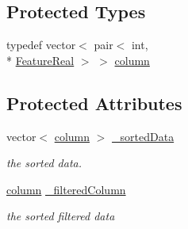 \subsection*{Protected Types}
\begin{DoxyCompactItemize}
\item 
typedef vector$<$ pair$<$ int, \\*
\hyperlink{Defaults_8h_a3a11cfe6a5d469d921716ca6291e934f}{Feature\-Real} $>$ $>$ \hyperlink{classMultiBoost_1_1SortedData_a56ab0bfd37309f0a9fcb00eb4feee18e}{column}
\end{DoxyCompactItemize}
\subsection*{Protected Attributes}
\begin{DoxyCompactItemize}
\item 
\hypertarget{classMultiBoost_1_1SortedData_a7a2a56a67006842a91f7e865a5e09a35}{vector$<$ \hyperlink{classMultiBoost_1_1SortedData_a56ab0bfd37309f0a9fcb00eb4feee18e}{column} $>$ \hyperlink{classMultiBoost_1_1SortedData_a7a2a56a67006842a91f7e865a5e09a35}{\-\_\-sorted\-Data}}\label{classMultiBoost_1_1SortedData_a7a2a56a67006842a91f7e865a5e09a35}

\begin{DoxyCompactList}\small\item\em the sorted data. \end{DoxyCompactList}\item 
\hypertarget{classMultiBoost_1_1SortedData_aa8169de00052de046285b14ae5a8bb44}{\hyperlink{classMultiBoost_1_1SortedData_a56ab0bfd37309f0a9fcb00eb4feee18e}{column} \hyperlink{classMultiBoost_1_1SortedData_aa8169de00052de046285b14ae5a8bb44}{\-\_\-filtered\-Column}}\label{classMultiBoost_1_1SortedData_aa8169de00052de046285b14ae5a8bb44}

\begin{DoxyCompactList}\small\item\em the sorted filtered data \end{DoxyCompactList}\end{DoxyCompactItemize}


